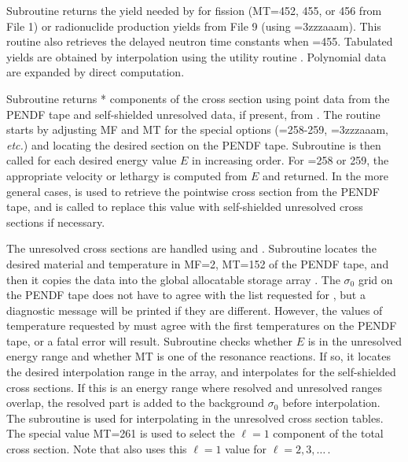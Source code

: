 Subroutine  returns the yield
needed by  for fission (MT=452, 455, or 456 from File 1)
or radionuclide production yields from File 9 (using =3zzzaaam).
 This routine also retrieves the delayed neutron time constants when
=455.  Tabulated yields are obtained by interpolation
using the utility routine .
Polynomial data are expanded by direct computation.

Subroutine  returns
* components of the cross section using point data
from the PENDF tape and self-shielded unresolved data, if present,
from .  The routine starts by
adjusting MF and MT for the special options (=258-259,
=3zzzaaam, {\it etc.}) and locating the desired section on
the PENDF tape.  Subroutine  is then called for each
desired energy value $E$ in increasing order.  For =258 or 259,
the appropriate velocity or lethargy is computed from $E$ and returned.
In the more general cases,  is used to retrieve the pointwise
cross section from the PENDF tape, and  is called to replace
this value with self-shielded unresolved cross sections if necessary.

The unresolved cross sections are handled using
and .
Subroutine  locates the desired material
and temperature in MF=2, MT=152 of the PENDF tape, and then it copies
the data into the global allocatable storage array .  The
$\sigma_0$ grid on the PENDF tape does not have to agree with the list
requested for , but a diagnostic message will be printed
if they are different.  However, the  values of temperature
requested by  must agree with the first 
temperatures on the PENDF tape, or a fatal error will result.
Subroutine  checks whether $E$ is in the unresolved energy
range and whether MT is one of the resonance reactions.  If so,
it locates the desired interpolation range in the  array, and
interpolates for the self-shielded cross sections.  If this is an
energy range where resolved and unresolved ranges overlap, the
resolved part is added to the background $\sigma_0$ before interpolation.
The subroutine  is used for interpolating in the unresolved
cross section tables.  The special value MT=261 is used to select
the $\ell{=}1$ component of the total cross section.  Note that
 also uses this $\ell{=}1$ value for $\ell{=}2, 3, \ldots\,$.


